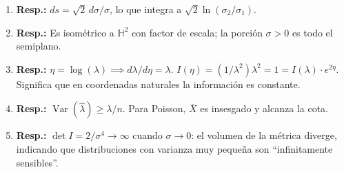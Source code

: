 \begin{enumerate}
	\item \textbf{Resp.:} $ds = \sqrt{2}\, d\sigma/\sigma$, lo que integra a $\sqrt{2}\ln(\sigma_2/\sigma_1)$.
	\item \textbf{Resp.:} Es isométrico a $\mathbb{H}^2$ con factor de escala; la porción $\sigma > 0$ es todo el semiplano.
	\item \textbf{Resp.:} $\eta = \log(\lambda) \implies d\lambda/d\eta = \lambda$. $I(\eta) = (1/\lambda^2)\lambda^2 = 1 = I(\lambda)\cdot e^{2\eta}$. Significa que en coordenadas naturales la información es constante.
	\item \textbf{Resp.:} $\operatorname{Var}(\hat\lambda) \ge \lambda/n$. Para Poisson, $\bar X$ es insesgado y alcanza la cota.
	\item \textbf{Resp.:} $\det I = 2/\sigma^4 \to \infty$ cuando $\sigma \to 0$: el volumen de la métrica diverge, indicando que distribuciones con varianza muy pequeña son ``infinitamente sensibles''.
\end{enumerate}

